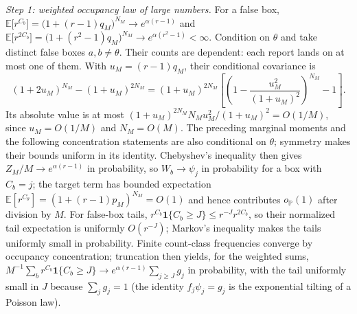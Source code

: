 \documentclass[11pt]{article}
\theoremstyle{definition}
\theoremstyle{remark}
\newcommand{\E}{\mathbb{E}}
\newcommand{\Prob}{\mathbb{P}}
\newcommand{\1}{\mathbf{1}}
\begin{document}
\emph{Step 1: weighted occupancy law of large numbers.} For a false box, $\E\bigl[r^{C_b}\bigr]=\bigl(1+(r-1)q_M\bigr)^{N_M}\to e^{\alpha(r-1)}$ and $\E\bigl[r^{2C_b}\bigr]=\bigl(1+(r^2-1)q_M\bigr)^{N_M}\to e^{\alpha(r^2-1)}<\infty$. Condition on $\theta$ and take distinct false boxes $a,b\ne\theta$. Their counts are dependent: each report lands on at most one of them. With $u_M=(r-1)q_M$, their conditional covariance is
\[
(1+2u_M)^{N_M}-(1+u_M)^{2N_M}
=(1+u_M)^{2N_M}\left[\left(1-\frac{u_M^2}{(1+u_M)^2}\right)^{N_M}-1\right].
\]
Its absolute value is at most $(1+u_M)^{2N_M}N_Mu_M^2/(1+u_M)^2=O(1/M)$, since $u_M=O(1/M)$ and $N_M=O(M)$. The preceding marginal moments and the following concentration statements are also conditional on $\theta$; symmetry makes their bounds uniform in its identity. Chebyshev's inequality then gives $Z_M/M\to e^{\alpha(r-1)}$ in probability, so $W_b\to\psi_j$ in probability for a box with $C_b=j$; the target term has bounded expectation $\E[r^{C_\theta}]=(1+(r-1)p_M)^{N_M}=O(1)$ and hence contributes $o_{\Prob}(1)$ after division by $M$. For false-box tails, $r^{C_b}\1\{C_b\ge J\}\le r^{-J}r^{2C_b}$, so their normalized tail expectation is uniformly $O(r^{-J})$; Markov's inequality makes the tails uniformly small in probability. Finite count-class frequencies converge by occupancy concentration; truncation then yields, for the weighted sums, $M^{-1}\sum_b r^{C_b}\1\{C_b\ge J\}\to e^{\alpha(r-1)}\sum_{j\ge J}g_j$ in probability, with the tail uniformly small in $J$ because $\sum_j g_j=1$ (the identity $f_j\psi_j=g_j$ is the exponential tilting of a Poisson law).
\end{document}
